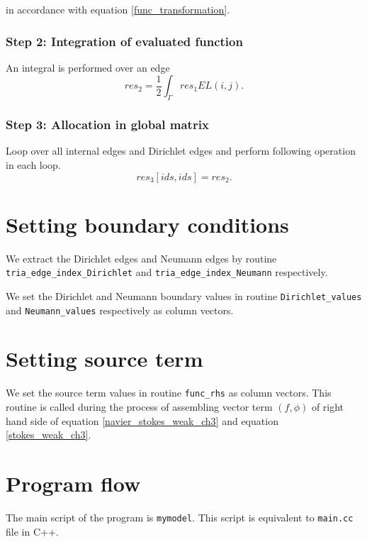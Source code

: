 \documentclass[a4paper,twoside,openright]{book}
\begin{document}
in accordance with equation \eqref{func_transformation}.\\

\subsubsection{Step 2: Integration of evaluated function}

An integral is performed over an edge
\begin{equation}
res_2 = \frac{1}{2} \int_{\Gamma} res_1 EL(i,j) \textrm{.}
\end{equation}

\subsubsection{Step 3: Allocation in global matrix}

Loop over all internal edges and Dirichlet edges and perform following operation in each loop.
\begin{equation}
res_3[ids,ids] = res_2 \textrm{.}
\end{equation}

\section{Setting boundary conditions}

We extract the Dirichlet edges and Neumann edges by routine \verb|tria_edge_index_Dirichlet| and \verb|tria_edge_index_Neumann| respectively.

We set the Dirichlet and Neumann boundary values in routine \verb|Dirichlet_values| and \verb|Neumann_values| respectively as column vectors. 

\section{Setting source term}

We set the source term values in routine \verb|func_rhs| as column vectors. This routine is called during the process of assembling vector term $(f,\phi)$ of right hand side of equation \eqref{navier_stokes_weak_ch3} and equation \eqref{stokes_weak_ch3}.

\section{Program flow}

The main script of the program is \verb|mymodel|. This script is equivalent to \verb|main.cc| file in C++.
\end{document}
